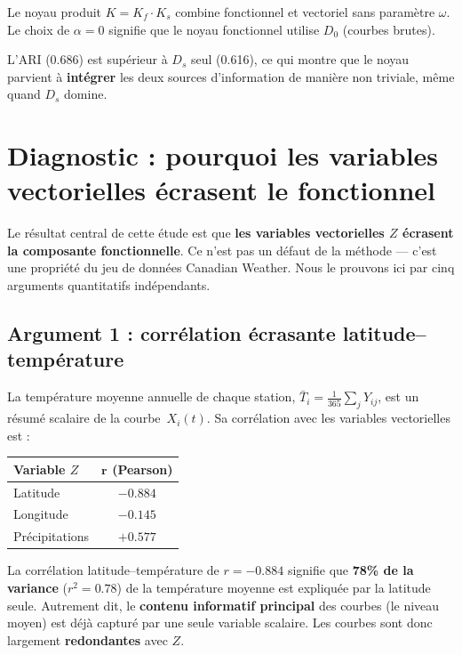 \documentclass[11pt, a4paper]{article}
\theoremstyle{definition}
\theoremstyle{remark}
\begin{document}
Le noyau produit $K = K_f \cdot K_s$ combine fonctionnel et vectoriel sans
paramètre $\omega$. Le choix de $\alpha = 0$ signifie que le noyau fonctionnel
utilise $D_0$ (courbes brutes).

L'ARI (0.686) est supérieur à $D_s$ seul (0.616), ce qui montre que le noyau
parvient à \textbf{intégrer} les deux sources d'information de manière
non triviale, même quand $D_s$ domine.

\section{Diagnostic : pourquoi les variables vectorielles écrasent le fonctionnel}
\label{sec:critique}

Le résultat central de cette étude est que \textbf{les variables vectorielles
$Z$ écrasent la composante fonctionnelle}. Ce n'est pas un défaut de la
méthode — c'est une propriété du jeu de données Canadian Weather. Nous le
prouvons ici par cinq arguments quantitatifs indépendants.

\subsection{Argument 1 : corrélation écrasante latitude–température}

La température moyenne annuelle de chaque station, $\bar{T}_i = \frac{1}{365}
\sum_j Y_{ij}$, est un résumé scalaire de la courbe~$X_i(t)$. Sa corrélation
avec les variables vectorielles est :

\begin{center}
\begin{tabular}{lc}
  \toprule
  \textbf{Variable $Z$} & $\boldsymbol{r}$ \textbf{(Pearson)} \\
  \midrule
  Latitude      & $-0.884$ \\
  Longitude     & $-0.145$ \\
  Précipitations & $+0.577$ \\
  \bottomrule
\end{tabular}
\end{center}

La corrélation latitude–température de $r = -0.884$ signifie que \textbf{78\%
de la variance} ($r^2 = 0.78$) de la température moyenne est expliquée par la
latitude seule. Autrement dit, le \textbf{contenu informatif principal} des
courbes (le niveau moyen) est déjà capturé par une seule variable scalaire.
Les courbes sont donc largement \textbf{redondantes} avec $Z$.
\end{document}
